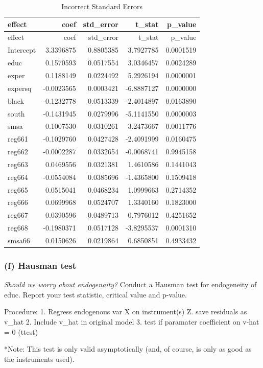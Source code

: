 \documentclass[11pt,]{article}
\begin{document}
\begin{longtable}[]{@{}lrrrr@{}}
\caption{Incorrect Standard Errors}\tabularnewline
\toprule
effect & coef & std\_error & t\_stat & p\_value\tabularnewline
\midrule
\endfirsthead
\toprule
effect & coef & std\_error & t\_stat & p\_value\tabularnewline
\midrule
\endhead
Intercept & 3.3396875 & 0.8805385 & 3.7927785 & 0.0001519\tabularnewline
educ & 0.1570593 & 0.0517554 & 3.0346457 & 0.0024289\tabularnewline
exper & 0.1188149 & 0.0224492 & 5.2926194 & 0.0000001\tabularnewline
expersq & -0.0023565 & 0.0003421 & -6.8887127 & 0.0000000\tabularnewline
black & -0.1232778 & 0.0513339 & -2.4014897 & 0.0163890\tabularnewline
south & -0.1431945 & 0.0279996 & -5.1141550 & 0.0000003\tabularnewline
smsa & 0.1007530 & 0.0310261 & 3.2473667 & 0.0011776\tabularnewline
reg661 & -0.1029760 & 0.0427428 & -2.4091999 & 0.0160475\tabularnewline
reg662 & -0.0002287 & 0.0332654 & -0.0068741 & 0.9945158\tabularnewline
reg663 & 0.0469556 & 0.0321381 & 1.4610586 & 0.1441043\tabularnewline
reg664 & -0.0554084 & 0.0385696 & -1.4365800 & 0.1509418\tabularnewline
reg665 & 0.0515041 & 0.0468234 & 1.0999663 & 0.2714352\tabularnewline
reg666 & 0.0699968 & 0.0524707 & 1.3340160 & 0.1823000\tabularnewline
reg667 & 0.0390596 & 0.0489713 & 0.7976012 & 0.4251652\tabularnewline
reg668 & -0.1980371 & 0.0517128 & -3.8295537 & 0.0001310\tabularnewline
smsa66 & 0.0150626 & 0.0219864 & 0.6850851 & 0.4933432\tabularnewline
\bottomrule
\end{longtable}

\subsubsection{(f) Hausman test}\label{f-hausman-test}

\emph{Should we worry about endogenaity?} Conduct a Hausman test for
endogeneity of educ. Report your test statistic, critical value and
p-value.

Procedure: 1. Regress endogenous var X on instrument(s) Z. save
residuals as v\_hat 2. Include v\_hat in original model 3. test if
paramater coefficient on v-hat = 0 (ttest)

*Note: This test is only valid asymptotically (and, of course, is only
as good as the instruments used).
\end{document}
